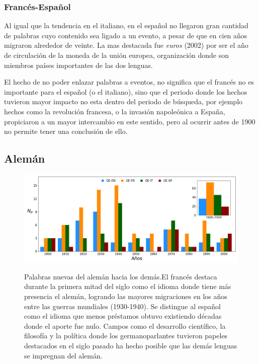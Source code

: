 \subsubsection*{Francés-Español}%

Al igual que la tendencia en el italiano, en el español no llegaron gran cantidad de palabras cuyo contenido sea ligado a un evento, a pesar de que en cien años migraron alrededor de veinte. La mas destacada fue \textit{euros} (2002) por ser el año de circulación de la moneda de la unión europea, organización donde son miembros países importantes de las dos lenguas. 

El hecho de no poder enlazar palabras a eventos, no significa que el francés no es importante para el español (o el italiano), sino que el periodo donde los hechos tuvieron mayor impacto no esta dentro del periodo de búsqueda,  por ejemplo hechos como la revolución francesa, o la invasión napoleónica a España, propiciaron a un mayor intercambio en este sentido, pero al ocurrir antes de 1900 no permite tener una conclusión de ello. 



\clearpage

\subsection{Alemán}%

\begin{figure}[h!]
	\centering
	\includegraphics[scale=.38]{Cap_3/NC_GE.png}
	\label{fig.NC_GE}
	\caption{Palabras nuevas del alemán hacia los demás.El francés destaca durante la primera mitad del siglo como el idioma donde tiene más presencia el alemán, logrando las mayores migraciones en los años entre las guerras mundiales (1930-1940). Se distingue al español como el idioma que menos préstamos obtuvo  existiendo décadas donde el aporte fue nulo.  Campos como el desarrollo científico, la filosofía  y la política donde los germanoparlantes tuvieron papeles destacados en el siglo pasado ha hecho posible que las demás lenguas se impregnan del alemán.}
\end{figure}




